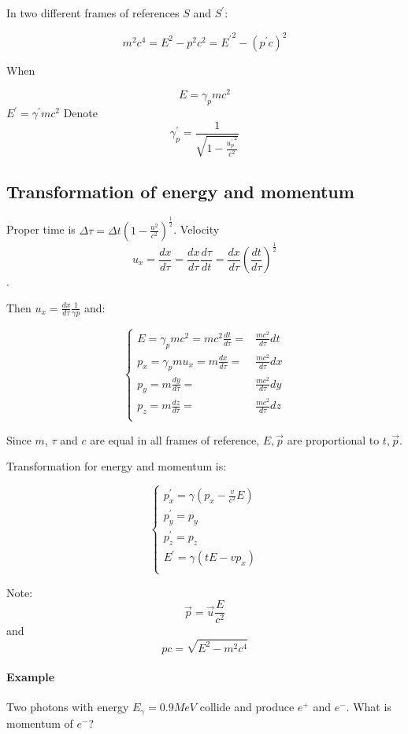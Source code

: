 In two different frames of references $S$ and $S^\prime$:

$$m^2c^4 = E^2-p^2c^2={E^\prime}^2-\left(p^\prime c\right)^2$$

When

$$E=\gamma_p mc^2$$
$E^\prime = \gamma^\prime mc^2$
Denote $$\gamma_p^\prime = \frac{1}{\sqrt{1-\frac{{u_p^\prime}^2}{c^2}}}$$

\subsection{Transformation of energy and momentum}

Proper time is $\Delta \tau = \Delta t \left(1-\frac{u^2}{c^2}\right)^\frac{1}{2}$. Velocity $$u_x = \frac{dx}{d\tau} = \frac{dx}{d\tau}\frac{d\tau}{dt} = \frac{dx}{d\tau} \left(\frac{dt}{d\tau}\right)^\frac{1}{2}$$.

Then $u_x = \frac{dx}{d\tau}\frac{1}{\gamma p}$ and:

$$\begin{cases}
E   = \gamma_p mc^2 = mc^2 \frac{dt}{d\tau} =& \frac{mc^2}{d\tau} dt\\
p_x = \gamma_p mu_x = m \frac{dx}{d\tau} =& \frac{mc^2}{d\tau} dx\\
p_y = m \frac{dy}{d\tau} =& \frac{mc^2}{d\tau} dy\\
p_z = m \frac{dz}{d\tau} =& \frac{mc^2}{d\tau} dz\\
\end{cases}$$



Since $m$, $\tau$ and $c$ are equal in all frames of reference, $E, \vec{p}$ are proportional to $t, \vec{p}$.

Transformation for energy and momentum is:

$$\begin{cases}
p_x^\prime = \gamma \left(p_x - \frac{v}{c^2}E\right)\\
p_y^\prime =p_y\\
p_z^\prime = p_z\\
E^\prime   = \gamma \left( tE  - vp_x \right)\\
\end{cases}$$

Note:
$$\vec{p} = \vec{u} \frac{E}{c^2}$$
and
$$pc = \sqrt{E^2-m^2c^4}$$

\paragraph{Example} Two photons with energy $E_\gamma = 0.9 MeV$ collide and produce $e^+$ and $e^-$. What is momentum of $e^-$?


